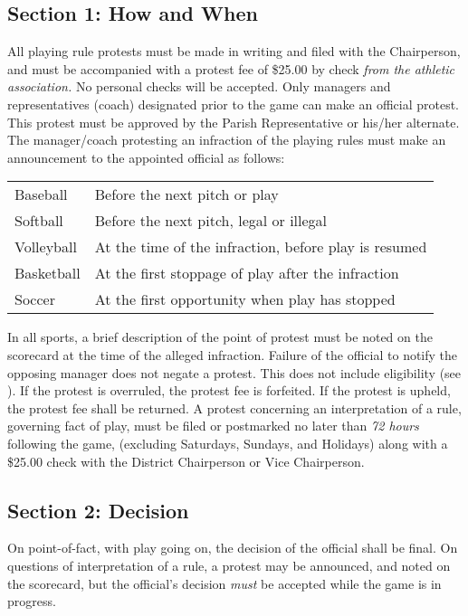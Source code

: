 \documentclass[letteraper,10pt,oneside,draft]{memoir}
\begin{document}
\subsection{Section 1: How and When}
\label{ssec:const-7-1}
All playing rule protests must be made in writing and filed with the Chairperson, and must be accompanied with a protest fee of \$25.00 by check {\em from the athletic association.} No personal checks will be accepted.  Only managers and representatives (coach) designated prior to the game can make an official protest.  This protest must be approved by the Parish Representative or his/her alternate.
The manager/coach protesting an infraction of the playing rules must make an announcement to the appointed official as follows:
\begin{center}
    \begin{tabular}{l l}
        Baseball & Before the next pitch or play\footnotemark[2] \\
        Softball & Before the next pitch, legal or illegal\footnotemark[2] \\
        Volleyball & At the time of the infraction, before play is resumed \\
        Basketball & At the first stoppage of play after the infraction \\
        Soccer & At the first opportunity when play has stopped \\
    \end{tabular}
\end{center}

In all sports, a brief description of the point of protest must be noted on the scorecard at the time of the alleged infraction.  Failure of the official to notify the opposing manager does not negate a protest.   This does not include eligibility (see ).  If the protest is overruled, the protest fee is forfeited. If the protest is upheld, the protest fee shall be returned. A protest concerning an interpretation of a rule, governing fact of play, must be filed or postmarked no later than {\em 72 hours} following the game, (excluding Saturdays, Sundays, and Holidays) along with a \$25.00 check with the District Chairperson or Vice Chairperson.

\subsection{Section 2: Decision}
\label{ssec:const-7-2}
On point-of-fact, with play going on, the decision of the official shall be final.  On questions of interpretation of a rule, a protest may be announced, and noted on the scorecard, but the official's decision {\em must} be accepted while the game is in progress.
\end{document}
